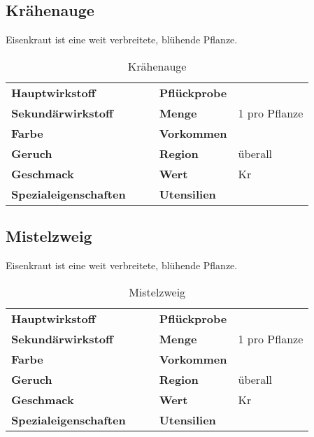 \subsection{Krähenauge}
Eisenkraut ist eine weit verbreitete, blühende Pflanze. 

\begin{table}[h]
\begin{center}
\begin{tabular}{|l|l|p{1cm}|l|l|}
	\cline{1-2} \cline{4-5}
	\textbf{Hauptwirkstoff} &  && \textbf{Pflückprobe} &  \\ \cline{1-2} \cline{4-5}
	\textbf{Sekundärwirkstoff} &  && \textbf{Menge} & 1 pro Pflanze \\ \cline{1-2} \cline{4-5}
	\textbf{Farbe} &  && \textbf{Vorkommen} &  \\ \cline{1-2} \cline{4-5}
	\textbf{Geruch} &  && \textbf{Region} & überall \\ \cline{1-2} \cline{4-5}
	\textbf{Geschmack} &  && \textbf{Wert} & Kr \\ \cline{1-2} \cline{4-5}
	\textbf{Spezialeigenschaften} &  && \textbf{Utensilien} &  \\ \cline{1-2} \cline{4-5}
\end{tabular}
\end{center}
\caption{Krähenauge}
\label{tab:kraehenauge}
\end{table}


\subsection{Mistelzweig}
Eisenkraut ist eine weit verbreitete, blühende Pflanze. 

\begin{table}[h]
\begin{center}
\begin{tabular}{|l|l|p{1cm}|l|l|}
	\cline{1-2} \cline{4-5}
	\textbf{Hauptwirkstoff} &  && \textbf{Pflückprobe} &  \\ \cline{1-2} \cline{4-5}
	\textbf{Sekundärwirkstoff} &  && \textbf{Menge} & 1 pro Pflanze \\ \cline{1-2} \cline{4-5}
	\textbf{Farbe} &  && \textbf{Vorkommen} &  \\ \cline{1-2} \cline{4-5}
	\textbf{Geruch} &  && \textbf{Region} & überall \\ \cline{1-2} \cline{4-5}
	\textbf{Geschmack} &  && \textbf{Wert} & Kr \\ \cline{1-2} \cline{4-5}
	\textbf{Spezialeigenschaften} &  && \textbf{Utensilien} &  \\ \cline{1-2} \cline{4-5}
\end{tabular}
\end{center}
\caption{Mistelzweig}
\label{tab:mistelzweig}
\end{table}


